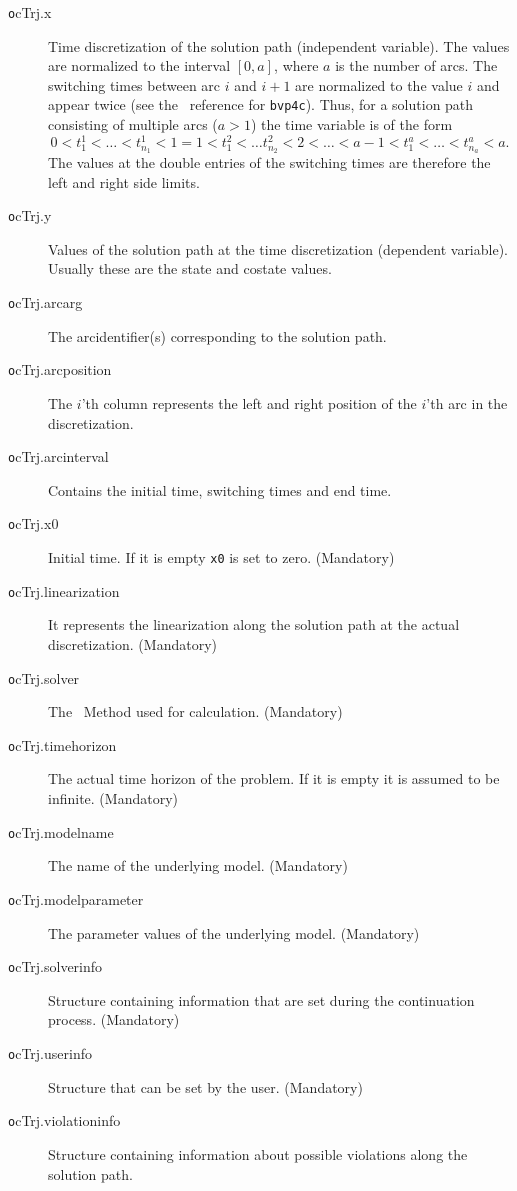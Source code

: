 \begin{description}
	\item[\texttt ocTrj.x]  Time discretization of the solution path (independent variable). The values are normalized to the interval $[0,a]$, where $a$ is the number of arcs. The switching times between arc $i$ and $i+1$ are normalized to the value $i$ and appear twice (see the \MATL\ reference for \lstinline+bvp4c+). Thus, for a solution path consisting of multiple arcs ($a>1$) the time variable is of the form
\begin{equation*}
	0<t_1^1<\ldots<t_{n_1}^1<1=1<t_1^2<\ldots t_{n_2}^2<2<\ldots<a-1<t_1^a<\ldots<t_{n_a}^a<a.
\end{equation*}
The values at the double entries of the switching times are therefore the left and right side limits.
\item[\texttt ocTrj.y]Values of the solution path at the time discretization (dependent variable). Usually these are the state and costate values.
\item[\texttt ocTrj.arcarg]The arcidentifier(s) corresponding to the solution path. 
\item[\texttt ocTrj.arcposition]The $i$'th column represents the left and right position of the $i$'th arc in the discretization. 
\item[\texttt ocTrj.arcinterval]Contains the initial time, switching times and end time. 
\item[\texttt ocTrj.x0]Initial time. If it is empty \lstinline+x0+ is set to zero. (Mandatory) 
\item[\texttt ocTrj.linearization]It represents the linearization along the solution path at the actual discretization. (Mandatory) 
\item[\texttt ocTrj.solver]The \BVP\ Method used for calculation. (Mandatory) 
\item[\texttt ocTrj.timehorizon]The actual time horizon of the problem. If it is empty it is assumed to be infinite. (Mandatory) 
\item[\texttt ocTrj.modelname]The name of the underlying model. (Mandatory) 
\item[\texttt ocTrj.modelparameter]The parameter values of the underlying model. (Mandatory) 
\item[\texttt ocTrj.solverinfo]Structure containing information that are set during the continuation process. (Mandatory) 
\item[\texttt ocTrj.userinfo]Structure that can be set by the user. (Mandatory) 
\item[\texttt ocTrj.violationinfo]Structure containing information about possible violations along the solution path. 
\end{description}
